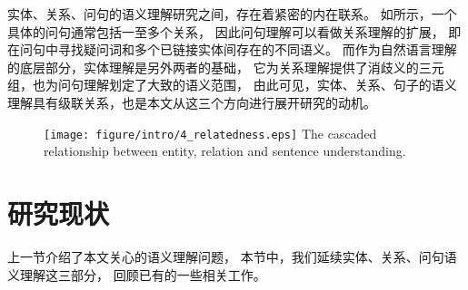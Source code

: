 

实体、关系、问句的语义理解研究之间，存在着紧密的内在联系。
如所示，一个具体的问句通常包括一至多个关系，
因此问句理解可以看做关系理解的扩展，
即在问句中寻找疑问词和多个已链接实体间存在的不同语义。
而作为自然语言理解的底层部分，实体理解是另外两者的基础，
它为关系理解提供了消歧义的三元组，也为问句理解划定了大致的语义范围，
由此可见，实体、关系、句子的语义理解具有级联关系，也是本文从这三个方向进行展开研究的动机。

\begin{figure}[th]
\centering
\texttt{[image: figure/intro/4\_relatedness.eps]}
{The cascaded relationship between entity, relation and sentence understanding.}
\label{fig:intro-relatedness}
\end{figure}


\section{研究现状}

上一节介绍了本文关心的语义理解问题，%
本节中，我们延续实体、关系、问句语义理解这三部分，
回顾已有的一些相关工作。

